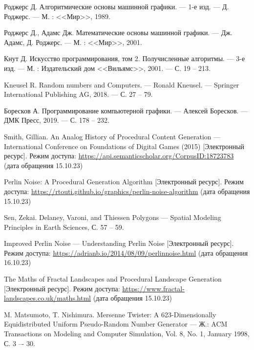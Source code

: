 \renewcommand\bibname{\large\bfseries\hfill{\centering СПИСОК ИСПОЛЬЗОВАННЫХ ИСТОЧНИКОВ}\hfill}
\begin{thebibliography}{}

	 Роджерс Д. Алгоритмические основы машинной графики. --- 1-е изд. --- Д. Роджерс. --- М. : <<Мир>>, 1989.
	
	 Роджерс Д., Адамс Дж. Математические основы машинной графики. --- Дж. Адамс, Д. Роджерс. --- М. : <<Мир>>, 2001.
	
	 Кнут Д. Искусство программирования, том 2. Получисленные алгоритмы. --- 3-е изд. --- М. : Издательский дом <<Вильямс>>, 2001. --- С. 19 -- 213.

	 Kneusel R. Random numbers and Computers. --- Ronald Kneusel. ---  Springer International Publishing AG, 2018. --- С. 27 -- 79.

	 Боресков А. Программирование компьютерной графики. --- Алексей Боресков. --- ДМК Пресс, 2019. --- С. 178 -- 232.

	 Smith, Gillian. An Analog History of Procedural Content Generation --- International Conference on Foundations of Digital Games (2015) [Электронный ресурс]. Режим доступа: \url{https://api.semanticscholar.org/CorpusID:18723783} (дата обращения 15.10.23)
	
	 Perlin Noise: A Procedural Generation Algorithm [Электронный ресурс]. Режим доступа: \url{https://rtouti.github.io/graphics/perlin-noise-algorithm} (дата обращения 15.10.23)
	
	 Sen, Zekai. Delaney, Varoni, and Thiessen Polygons --- Spatial Modeling Principles in Earth Sciences, С. 57 -- 59.
	
	 Improved Perlin Noise --- Understanding Perlin Noise [Электронный ресурс]. Режим доступа: \url{https://adrianb.io/2014/08/09/perlinnoise.html} (дата обращения 16.10.23)
	
	 The Maths of Fractal Landscapes and Procedural Landscape Generation [Электронный ресурс]. Режим доступа:	\url{https://www.fractal-landscapes.co.uk/maths.html} (дата обращения 15.10.23)
	
	 M. Matsumoto, T. Nishimura. Mersenne Twister: A 623-Dimensionally Equidistributed Uniform Pseudo-Random Number Generator --- Ж.: ACM Transactions on Modeling and Computer Simulation, Vol. 8, No. 1, January 1998, С. 3 –- 30.
	

\end{thebibliography}
